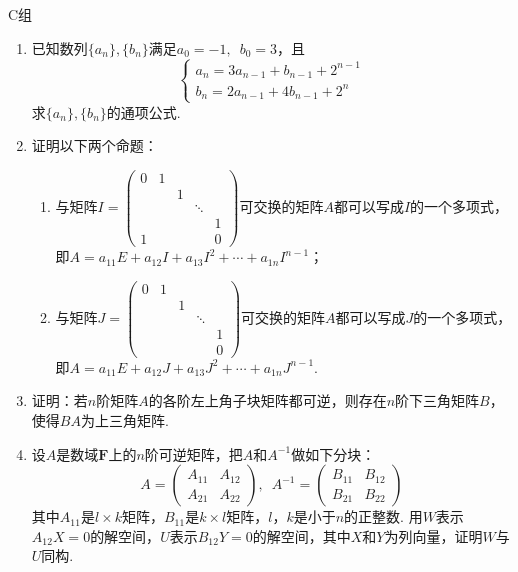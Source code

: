 \centerline{\heiti C组}
\begin{enumerate}
    \item 已知数列$\{a_n\},\{b_n\}$满足$a_0=-1,\enspace b_0=3$，且
          \[\begin{cases}
                  a_n=3a_{n-1}+b_{n-1}+2^{n-1} \\
                  b_n=2a_{n-1}+4b_{n-1}+2^n
              \end{cases}\]
          求$\{a_n\},\{b_n\}$的通项公式.

    \item 证明以下两个命题：
          \begin{enumerate}
              \item 与矩阵$I=\begin{pmatrix}
                            0 & 1 &   &        &   \\
                              &   & 1 &        &   \\
                              &   &   & \ddots &   \\
                              &   &   &        & 1 \\
                            1 &   &   &        & 0
                        \end{pmatrix}$可交换的矩阵$A$都可以写成$I$的一个多项式，即$A=a_{11}E+a_{12}I+a_{13}I^2+\cdots+a_{1n}I^{n-1}$；

              \item 与矩阵$J=\begin{pmatrix}
                            0 & 1 &   &        &   \\
                              &   & 1 &        &   \\
                              &   &   & \ddots &   \\
                              &   &   &        & 1 \\
                              &   &   &        & 0
                        \end{pmatrix}$可交换的矩阵$A$都可以写成$J$的一个多项式，即$A=a_{11}E+a_{12}J+a_{13}J^2+\cdots+a_{1n}J^{n-1}$.
          \end{enumerate}

    \item 证明：若$n$阶矩阵$A$的各阶左上角子块矩阵都可逆，则存在$n$阶下三角矩阵$B$，使得$BA$为上三角矩阵.

    \item 设$A$是数域$\mathbf{F}$上的$n$阶可逆矩阵，把$A$和$A^{-1}$做如下分块：
        \[A=\begin{pmatrix}
                A_{11} & A_{12} \\ A_{21} & A_{22}
            \end{pmatrix},\enspace A^{-1}=\begin{pmatrix}
                B_{11} & B_{12} \\ B_{21} & B_{22}
            \end{pmatrix}\]
        其中$A_{11}$是$l \times k$矩阵，$B_{11}$是$k \times l$矩阵，$l$，$k$是小于$n$的正整数. 用$W$表示$A_{12}X=0$的解空间，$U$表示$B_{12}Y=0$的解空间，其中$X$和$Y$为列向量，证明$W$与$U$同构.


\end{enumerate}
